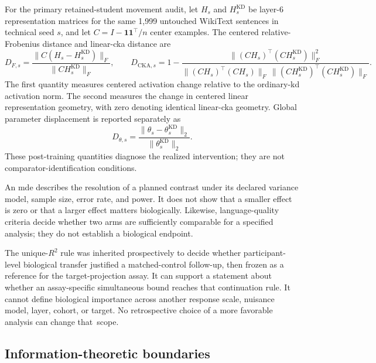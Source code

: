 For the primary retained-student movement audit, let \(H_s\) and \(H_s^{\mathrm{KD}}\) be layer-6 representation matrices for the same 1,999 untouched WikiText sentences in technical seed \(s\), and let \(C=I-\mathbf{1}\mathbf{1}^{\top}/n\) center examples.
The centered relative-Frobenius distance and linear-\ac{cka} distance are
\begin{equation}
D_{F,s}
=
\frac{\lVert C(H_s-H_s^{\mathrm{KD}})\rVert_F}
{\lVert C H_s^{\mathrm{KD}}\rVert_F},
\qquad
D_{\mathrm{CKA},s}
=
1-
\frac{\lVert (CH_s)^{\top}(CH_s^{\mathrm{KD}})\rVert_F^2}
{\lVert (CH_s)^{\top}(CH_s)\rVert_F\,
 \lVert (CH_s^{\mathrm{KD}})^{\top}(CH_s^{\mathrm{KD}})\rVert_F}.
\label{eq:movement-distances}
\end{equation}
The first quantity measures centered activation change relative to the ordinary-\ac{kd} activation norm.
The second measures the change in centered linear representation geometry, with zero denoting identical linear-\ac{cka} geometry.
Global parameter displacement is reported separately as
\begin{equation}
D_{\theta,s}
=
\frac{\lVert\theta_s-\theta_s^{\mathrm{KD}}\rVert_2}
{\lVert\theta_s^{\mathrm{KD}}\rVert_2}.
\label{eq:parameter-displacement}
\end{equation}
These post-training quantities diagnose the realized intervention; they are not comparator-identification conditions.

An \ac{mde} describes the resolution of a planned contrast under its declared variance model, sample size, error rate, and power.
It does not show that a smaller effect is zero or that a larger effect matters biologically.
Likewise, language-quality criteria decide whether two arms are sufficiently comparable for a specified analysis; they do not establish a biological endpoint.

The  unique-\(R^2\) rule was inherited prospectively to decide whether participant-level biological transfer justified a matched-control follow-up, then frozen as a reference for the target-projection assay. 
It can support a statement about whether an assay-specific simultaneous bound reaches that continuation rule.
It cannot define biological importance across another response scale, nuisance model, layer, cohort, or target.
No retrospective choice of a more favorable analysis can change that~scope.

\subsection{Information-theoretic boundaries}

